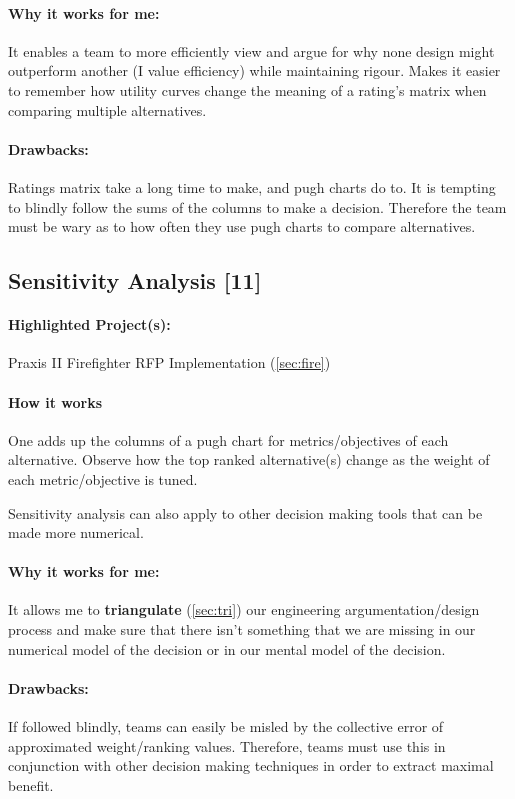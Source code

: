 \documentclass[a4paper,12pt]{article}
\begin{document}
\paragraph{Why it works for me: }
It enables a team to more efficiently view and argue for why none design might outperform another (I value efficiency) while maintaining rigour. Makes it easier to remember how utility curves change the meaning of a rating’s matrix when comparing multiple alternatives.

\paragraph{Drawbacks: }
Ratings matrix take a long time to make, and pugh charts do to. It is tempting to blindly follow the sums of the columns to make a decision. Therefore the team must be wary as to how often they use pugh charts to compare alternatives.

\subsection{Sensitivity Analysis [11]}
\label{sec:sense}
\paragraph{Highlighted Project(s): } Praxis II Firefighter RFP Implementation (\ref{sec:fire})
\paragraph{How it works}
One adds up the columns of a pugh chart for metrics/objectives of each alternative. Observe how the top ranked alternative(s) change as the weight of each metric/objective is tuned.

Sensitivity analysis can also apply to other decision making tools that can be made more numerical.

\paragraph{Why it works for me: }
It allows me to \textbf{triangulate} (\ref{sec:tri}) our engineering argumentation/design process and make sure that there isn’t something that we are missing in our numerical model of the decision or in our mental model of the decision.

\paragraph{Drawbacks: }
If followed blindly, teams can easily be misled by the collective error of approximated weight/ranking values. Therefore, teams must use this in conjunction with other decision making techniques in order to extract maximal benefit.
\end{document}
